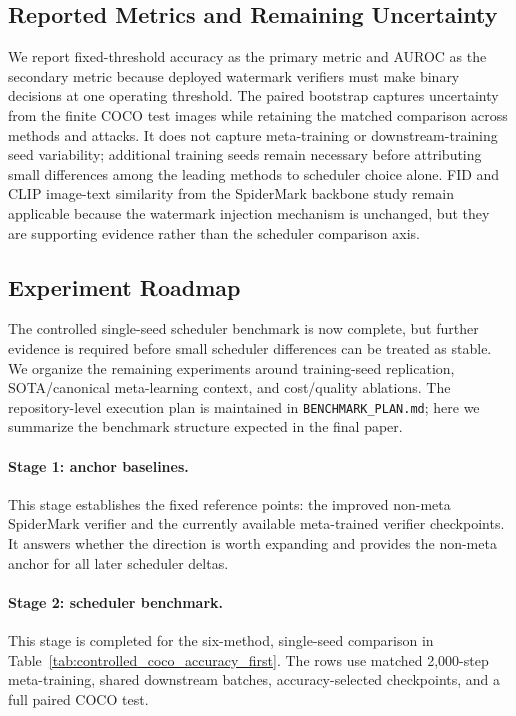 \subsection{Reported Metrics and Remaining Uncertainty}

We report fixed-threshold accuracy as the primary metric and AUROC as the secondary metric because deployed watermark verifiers must make binary decisions at one operating threshold.
The paired bootstrap captures uncertainty from the finite COCO test images while retaining the matched comparison across methods and attacks.
It does not capture meta-training or downstream-training seed variability; additional training seeds remain necessary before attributing small differences among the leading methods to scheduler choice alone.
FID and CLIP image-text similarity from the SpiderMark backbone study remain applicable because the watermark injection mechanism is unchanged, but they are supporting evidence rather than the scheduler comparison axis.

\subsection{Experiment Roadmap}

The controlled single-seed scheduler benchmark is now complete, but further evidence is required before small scheduler differences can be treated as stable.
We organize the remaining experiments around training-seed replication, SOTA/canonical meta-learning context, and cost/quality ablations.
The repository-level execution plan is maintained in \texttt{BENCHMARK\_PLAN.md}; here we summarize the benchmark structure expected in the final paper.

\paragraph{Stage 1: anchor baselines.}
This stage establishes the fixed reference points: the improved non-meta SpiderMark verifier and the currently available meta-trained verifier checkpoints.
It answers whether the direction is worth expanding and provides the non-meta anchor for all later scheduler deltas.

\paragraph{Stage 2: scheduler benchmark.}
This stage is completed for the six-method, single-seed comparison in Table~\ref{tab:controlled_coco_accuracy_first}.
The rows use matched 2,000-step meta-training, shared downstream batches, accuracy-selected checkpoints, and a full paired COCO test.

